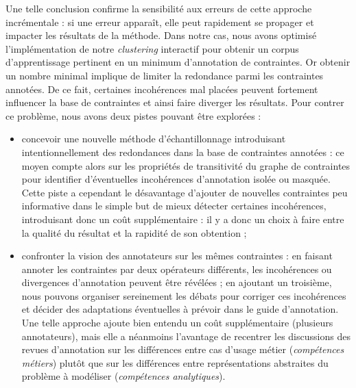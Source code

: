 			Une telle conclusion confirme la sensibilité aux erreurs de cette approche incrémentale : si une erreur apparaît, elle peut rapidement se propager et impacter les résultats de la méthode.
			Dans notre cas, nous avons optimisé l'implémentation de notre \textit{clustering} interactif pour obtenir un corpus d'apprentissage pertinent en un minimum d'annotation de contraintes.
			Or obtenir un nombre minimal implique de limiter la redondance parmi les contraintes annotées.
			De ce fait, certaines incohérences mal placées peuvent fortement influencer la base de contraintes et ainsi faire diverger les résultats.
			Pour contrer ce problème, nous avons deux pistes pouvant être explorées :
			\begin{itemize}
				\item concevoir une nouvelle méthode d'échantillonnage introduisant intentionnellement des redondances dans la base de contraintes annotées : ce moyen compte alors sur les propriétés de transitivité du graphe de contraintes pour identifier d'éventuelles incohérences d'annotation isolée ou masquée.
				Cette piste a cependant le désavantage d'ajouter de nouvelles contraintes peu informative dans le simple but de mieux détecter certaines incohérences, introduisant donc un coût supplémentaire : il y a donc un choix à faire entre la qualité du résultat et la rapidité de son obtention ;
				\item confronter la vision des annotateurs sur les mêmes contraintes : en faisant annoter les contraintes par deux opérateurs différents, les incohérences ou divergences d'annotation peuvent être révélées ; en ajoutant un troisième, nous pouvons organiser sereinement les débats pour corriger ces incohérences et décider des adaptations éventuelles à prévoir dans le guide d'annotation.
				Une telle approche ajoute bien entendu un coût supplémentaire (plusieurs annotateurs), mais elle a néanmoins l'avantage de recentrer les discussions des revues d'annotation sur les différences entre cas d'usage métier (\textit{compétences métiers}) plutôt que sur les différences entre représentations abstraites du problème à modéliser (\textit{compétences analytiques}).
			\end{itemize}
			

